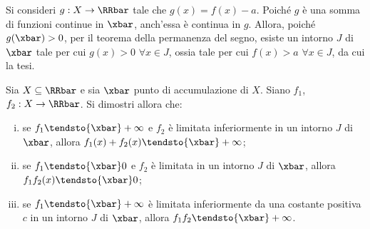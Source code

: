 \documentclass[11pt]{article}
\begin{document}
	\begin{solution}
		Si consideri $g : X \to \RRbar$ tale che $g(x) = f(x) - a$. Poiché $g$ è una somma di
		funzioni continue in $\xbar$, anch'essa è continua in $g$. Allora, poiché $g(\xbar) > 0$,
		per il teorema della permanenza del segno, esiste un intorno $J$ di $\xbar$ tale per cui
		$g(x) > 0$ $\forall x \in J$, ossia tale per cui $f(x) > a$ $\forall x \in J$, da cui la tesi.
	\end{solution}

	\begin{exercise}
		Sia $X \subseteq \RRbar$ e sia $\xbar$ punto di accumulazione di $X$. Siano
		$f_1$, $f_2 : X \to \RRbar$. Si dimostri allora che:
		
		\begin{enumerate}[(i)]
			\item se $f_1 \tendsto{\xbar} +\infty$ e $f_2$ è limitata inferiormente
			in un intorno $J$ di $\xbar$, allora $f_1(x) + f_2(x) \tendsto{\xbar} +\infty$;
			\item se $f_1 \tendsto{\xbar} 0$ e $f_2$ è limitata in un intorno $J$
			di $\xbar$, allora $f_1 f_2(x) \tendsto{\xbar} 0$;
			\item se $f_1 \tendsto{\xbar} +\infty$ è limitata inferiormente
			da una costante positiva $c$ in un intorno $J$ di $\xbar$, allora
			$f_1 f_2 \tendsto{\xbar} +\infty$. 
		\end{enumerate}
	\end{exercise}
\end{document}
